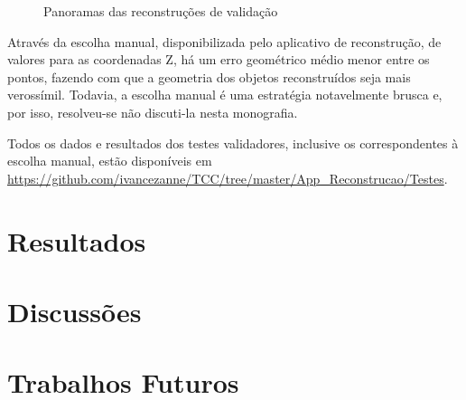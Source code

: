 		\begin{figure}[!htb]
			\centering
			\quad
			\quad
			\caption{Panoramas das reconstruções de validação}
			\label{printTestes}
		\end{figure}
		
		Através da escolha manual, disponibilizada pelo aplicativo de reconstrução, de valores para as coordenadas Z, há um erro geométrico médio menor entre os pontos, fazendo com que a geometria dos objetos reconstruídos seja mais verossímil. Todavia, a escolha manual é uma estratégia notavelmente brusca e, por isso, resolveu-se não discuti-la nesta monografia.
		
		Todos os dados e resultados dos testes validadores, inclusive os correspondentes à escolha manual, estão disponíveis em \url{https://github.com/ivancezanne/TCC/tree/master/App_Reconstrucao/Testes}.
		
		\section{Resultados}
			\label{secaoResultados}
			
		\section{Discussões}
			\label{secaoDiscussoes}
			
		\section{Trabalhos Futuros}
			\label{secaoTrabalhosFuturos}